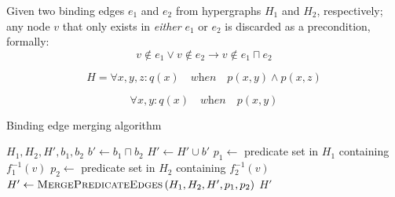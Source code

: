 \documentclass[../Master.tex]{subfiles}
\providecommand{\master}{..}
\begin{document}
\begin{proposition}
    Given two binding edges $e_1$ and $e_2$ from hypergraphs $H_1$ and $H_2$, respectively; any node $v$ that only exists in \emph{either} $e_1$ or $e_2$ is discarded as a precondition, formally:
    \begin{equation*}
        v \notin e_1 \lor v \notin e_2 \rightarrow v \notin e_1 \sqcap e_2
    \end{equation*}
\end{proposition}

\begin{example}
    \begin{equation*}
        H = \forall x, y, z : q(x) \quad \textit{when} \quad
            p(x,y) \land p(x,z)
    \end{equation*}

    \begin{equation}
        \forall x, y : q(x) \quad \textit{when} \quad p(x,y)
    \end{equation}

    \begin{figure}
        \centering
        \begin{subfigure}[b]{0.4\textwidth}
            \centering
            \resizebox{\linewidth}{!}{}
            \caption{}
            \label{fig:ex:ca:hgma:ex:isomorphic}
        \end{subfigure}%
        \hfill%
        \begin{subfigure}[b]{0.4\textwidth}
            \centering
            \resizebox{0.8\linewidth}{!}{}
            \caption{}
            \label{fig:ex:ca:hgma:ex:isomorphic_reduced}
        \end{subfigure}
    \end{figure}
\end{example}

\begin{algorithm}
    \caption{Binding edge merging algorithm}
    \label{algo:bindingedgemerge}
    \begin{algorithmic}
         {$H_1, H_2, H', b_1, b_2$}
            \State $b' \gets b_1 \sqcap b_2$
            \State $H' \gets H' \cup b'$
                    \State $p_1 \gets$ predicate set in $H_1$ containing $f_1^{-1}(v)$
                    \State $p_2 \gets$ predicate set in $H_2$ containing $f_2^{-1}(v)$
                    \State $H' \gets \textsc{MergePredicateEdges}
                                        \left( H_1, H_2, H', p_1, p_2 \right)$
                \EndIf
            \EndFor
            \State \Return $H'$
        \EndFunction
    \end{algorithmic}
\end{algorithm}
\end{document}
